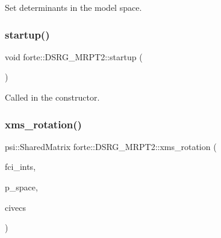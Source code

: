 Set determinants in the model space. 

\mbox{\label{classforte_1_1_d_s_r_g___m_r_p_t2_ab386924d3bc56b2a95912e860cdc5c50}} 
\subsubsection{\texorpdfstring{startup()}{startup()}}
{\footnotesize\ttfamily void forte\+::\+D\+S\+R\+G\+\_\+\+M\+R\+P\+T2\+::startup (\begin{DoxyParamCaption}{ }\end{DoxyParamCaption})\hspace{0.3cm}{\ttfamily [protected]}}



Called in the constructor. 

\mbox{\label{classforte_1_1_d_s_r_g___m_r_p_t2_a43625a369c2b1282becd2c0b2354765c}} 
\subsubsection{\texorpdfstring{xms\+\_\+rotation()}{xms\_rotation()}}
{\footnotesize\ttfamily psi\+::\+Shared\+Matrix forte\+::\+D\+S\+R\+G\+\_\+\+M\+R\+P\+T2\+::xms\+\_\+rotation (\begin{DoxyParamCaption}\item[{std\+::shared\+\_\+ptr$<$ \mbox{\hyperlink{classforte_1_1_active_space_integrals}{Active\+Space\+Integrals}} $>$}]{fci\+\_\+ints,  }\item[{std\+::vector$<$ \mbox{\hyperlink{namespaceforte_a2076c63fd7b8732004d9e1442ce527c1}{Determinant}} $>$ \&}]{p\+\_\+space,  }\item[{psi\+::\+Shared\+Matrix}]{civecs }\end{DoxyParamCaption})\hspace{0.3cm}{\ttfamily [protected]}}



